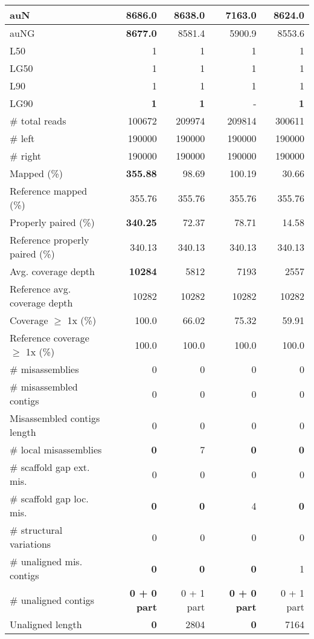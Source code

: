 \documentclass[12pt,a4paper]{article}
\begin{document}
\begin{table}[ht]
\begin{center}
\begin{tabular}{|l*{4}{|r}|}
auN & {\bf 8686.0} & 8638.0 & 7163.0 & 8624.0 \\ \hline
auNG & {\bf 8677.0} & 8581.4 & 5900.9 & 8553.6 \\ \hline
L50 & 1 & 1 & 1 & 1 \\ \hline
LG50 & 1 & 1 & 1 & 1 \\ \hline
L90 & 1 & 1 & 1 & 1 \\ \hline
LG90 & {\bf 1} & {\bf 1} & - & {\bf 1} \\ \hline
\# total reads & 100672 & 209974 & 209814 & 300611 \\ \hline
\# left & 190000 & 190000 & 190000 & 190000 \\ \hline
\# right & 190000 & 190000 & 190000 & 190000 \\ \hline
Mapped (\%) & {\bf 355.88} & 98.69 & 100.19 & 30.66 \\ \hline
Reference mapped (\%) & 355.76 & 355.76 & 355.76 & 355.76 \\ \hline
Properly paired (\%) & {\bf 340.25} & 72.37 & 78.71 & 14.58 \\ \hline
Reference properly paired (\%) & 340.13 & 340.13 & 340.13 & 340.13 \\ \hline
Avg. coverage depth & {\bf 10284} & 5812 & 7193 & 2557 \\ \hline
Reference avg. coverage depth & 10282 & 10282 & 10282 & 10282 \\ \hline
Coverage $\geq$ 1x (\%) & 100.0 & 66.02 & 75.32 & 59.91 \\ \hline
Reference coverage $\geq$ 1x (\%) & 100.0 & 100.0 & 100.0 & 100.0 \\ \hline
\# misassemblies & 0 & 0 & 0 & 0 \\ \hline
\# misassembled contigs & 0 & 0 & 0 & 0 \\ \hline
Misassembled contigs length & 0 & 0 & 0 & 0 \\ \hline
\# local misassemblies & {\bf 0} & 7 & {\bf 0} & {\bf 0} \\ \hline
\# scaffold gap ext. mis. & 0 & 0 & 0 & 0 \\ \hline
\# scaffold gap loc. mis. & {\bf 0} & {\bf 0} & 4 & {\bf 0} \\ \hline
\# structural variations & 0 & 0 & 0 & 0 \\ \hline
\# unaligned mis. contigs & {\bf 0} & {\bf 0} & {\bf 0} & 1 \\ \hline
\# unaligned contigs & {\bf 0 + 0 part} & 0 + 1 part & {\bf 0 + 0 part} & 0 + 1 part \\ \hline
Unaligned length & {\bf 0} & 2804 & {\bf 0} & 7164 \\ \hline

\end{tabular}
\end{center}
\end{table}
\end{document}
